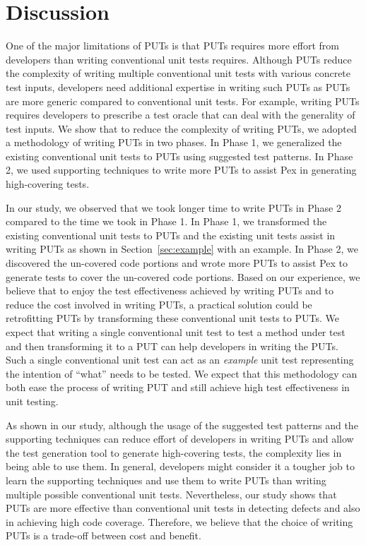 \section{Discussion} 
\label{sec:limitations}

One of the major limitations of PUTs is that PUTs requires
more effort from developers than writing conventional unit tests requires. Although PUTs reduce the complexity of writing multiple conventional unit tests with various concrete test inputs, developers
need additional expertise in writing such PUTs as PUTs are more generic compared to conventional unit tests. For example, writing PUTs requires developers to prescribe a test oracle that can deal with the generality of test inputs. We show that to reduce the complexity of writing PUTs, we adopted a methodology of writing PUTs in two phases. In Phase 1, we generalized the existing conventional unit tests to PUTs using suggested test patterns. In Phase 2, we used supporting techniques to write more PUTs to assist Pex in generating high-covering tests. 

In our study, we observed that we took longer time to write PUTs in Phase 2 compared to the time we took in Phase 1. In Phase 1, we transformed the existing conventional unit tests to PUTs and the existing unit tests assist in writing PUTs as shown in Section~\ref{sec:example} with an example. In Phase 2, we discovered the un-covered code portions and wrote more PUTs to assist Pex to generate tests to cover the un-covered code portions. Based on our experience, we believe that to enjoy the test effectiveness achieved by writing PUTs and to reduce the cost involved in writing PUTs, a practical solution could be retrofitting PUTs by transforming these conventional unit tests to PUTs. We expect that writing a single conventional unit test to test a method under test and then transforming it to a PUT can help developers in writing the PUTs. Such a single conventional unit test can act as an \textit{example} unit test representing the intention of ``what'' needs to be tested. We expect that this methodology can both ease the process of writing PUT and still achieve high test effectiveness in unit testing. 

As shown in our study, although the usage of the suggested test patterns and the supporting techniques can reduce effort of developers in writing PUTs and allow the test generation tool to generate high-covering tests, the complexity lies in being able to use them. In general, developers might consider it a tougher job to learn the supporting techniques and use them to write PUTs than writing multiple possible conventional unit tests. Nevertheless, our study shows that PUTs are more effective than conventional unit tests in detecting defects and also in achieving high code coverage. Therefore, we believe that the choice of writing PUTs is a trade-off between cost and benefit.